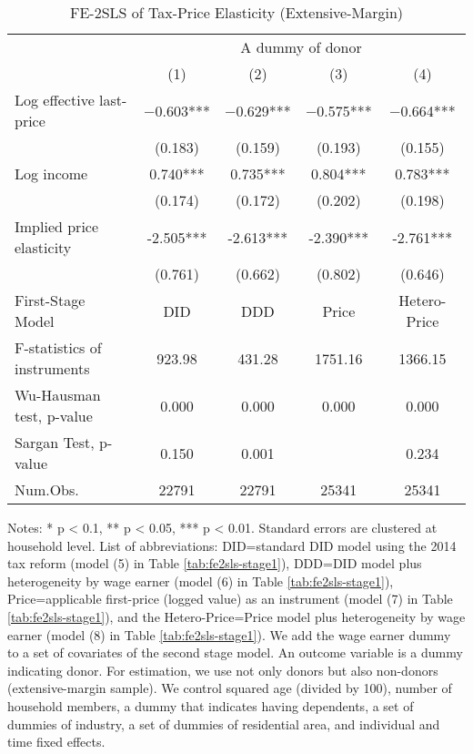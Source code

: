 \begin{table}

\caption{FE-2SLS of Tax-Price Elasticity (Extensive-Margin)\label{tab:fe2sls-ext}}
\centering
\fontsize{8}{10}\selectfont
\begin{threeparttable}
\begin{tabular}[t]{lcccc}
\toprule
\multicolumn{1}{c}{ } & \multicolumn{4}{c}{A dummy of donor} \\
\cmidrule(l{3pt}r{3pt}){2-5}
  & (1) & (2) & (3) & (4)\\
\midrule
Log effective last-price & \num{-0.603}*** & \num{-0.629}*** & \num{-0.575}*** & \num{-0.664}***\\
 & (\num{0.183}) & (\num{0.159}) & (\num{0.193}) & (\num{0.155})\\
Log income & \num{0.740}*** & \num{0.735}*** & \num{0.804}*** & \num{0.783}***\\
 & (\num{0.174}) & (\num{0.172}) & (\num{0.202}) & (\num{0.198})\\
\midrule
Implied price elasticity & -2.505*** & -2.613*** & -2.390*** & -2.761***\\
 & (0.761) & (0.662) & (0.802) & (0.646)\\
First-Stage Model & DID & DDD & Price & Hetero-Price\\
F-statistics of instruments & 923.98 & 431.28 & 1751.16 & 1366.15\\
Wu-Hausman test, p-value & 0.000 & 0.000 & 0.000 & 0.000\\
Sargan Test, p-value & 0.150 & 0.001 &  & 0.234\\
Num.Obs. & \num{22791} & \num{22791} & \num{25341} & \num{25341}\\
\bottomrule
\end{tabular}
\begin{tablenotes}
\item Notes: * p < 0.1, ** p < 0.05, *** p < 0.01. Standard errors are clustered at household level. List of abbreviations: DID=standard DID model using the 2014 tax reform (model (5) in Table \ref{tab:fe2sls-stage1}), DDD=DID model plus heterogeneity by wage earner (model (6) in Table \ref{tab:fe2sls-stage1}), Price=applicable first-price (logged value) as an instrument (model (7) in Table \ref{tab:fe2sls-stage1}), and the Hetero-Price=Price model plus heterogeneity by wage earner (model (8) in Table \ref{tab:fe2sls-stage1}). We add the wage earner dummy to a set of covariates of the second stage model. An outcome variable is a dummy indicating donor. For estimation, we use not only donors but also non-donors (extensive-margin sample). We control squared age (divided by 100), number of household members, a dummy that indicates having dependents, a set of dummies of industry, a set of dummies of residential area, and individual and time fixed effects.
\end{tablenotes}
\end{threeparttable}
\end{table}

